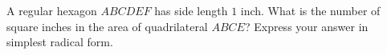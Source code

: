 A regular hexagon $ABCDEF$ has side length $1$ inch. What is the number of square inches in the area of quadrilateral $ABCE$? Express your answer in simplest radical form.
